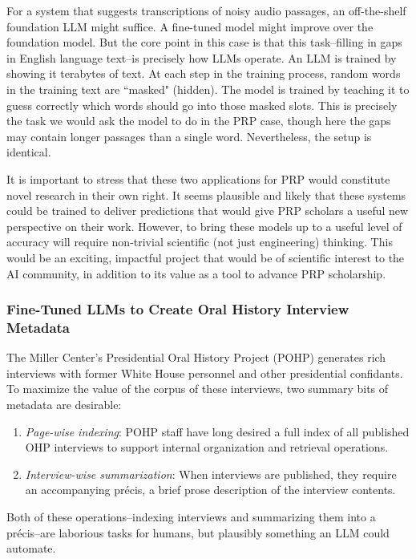 \documentclass[12pt, oneside]{article}   	%
\begin{document}
For a system that suggests transcriptions of noisy audio passages, an off-the-shelf foundation LLM might suffice.  A fine-tuned model might improve over the foundation model.  But the core point in this case is that this task--filling in gaps in English language text--is precisely how LLMs operate.  An LLM is trained by showing it terabytes of text.  At each step in the training process, random words in the training text are ``masked" (hidden).  The model is trained by teaching it to guess correctly which words should go into those masked slots.  This is precisely the task we would ask the model to do in the PRP case, though here the gaps may contain longer passages than a single word.  Nevertheless, the setup is identical.

It is important to stress that these two applications for PRP would constitute novel research in their own right.  It seems plausible and likely that these systems could be trained to deliver predictions that would give PRP scholars a useful new perspective on their work.  However, to bring these models up to a useful level of accuracy will require non-trivial scientific (not just engineering) thinking.  This would be an exciting, impactful project that would be of scientific interest to the AI community, in addition to its value as a tool to advance PRP scholarship.


\subsubsection{Fine-Tuned LLMs to Create Oral History Interview Metadata}\label{section.applications.hard.pohp}
The Miller Center's Presidential Oral History Project (POHP) generates rich interviews with former White House personnel and other presidential confidants.  To maximize the value of the corpus of these interviews, two summary bits of metadata are desirable:
\begin{enumerate}
\item \emph{Page-wise indexing}: POHP staff have long desired a full index of all published OHP interviews to support internal organization and retrieval operations.
\item \emph{Interview-wise summarization}: When interviews are published, they require an accompanying pr\'{e}cis, a brief prose description of the interview contents.
\end{enumerate} 
Both of these operations--indexing interviews and summarizing them into a pr\'{e}cis--are laborious tasks for humans, but plausibly something an LLM could automate.
\end{document}
